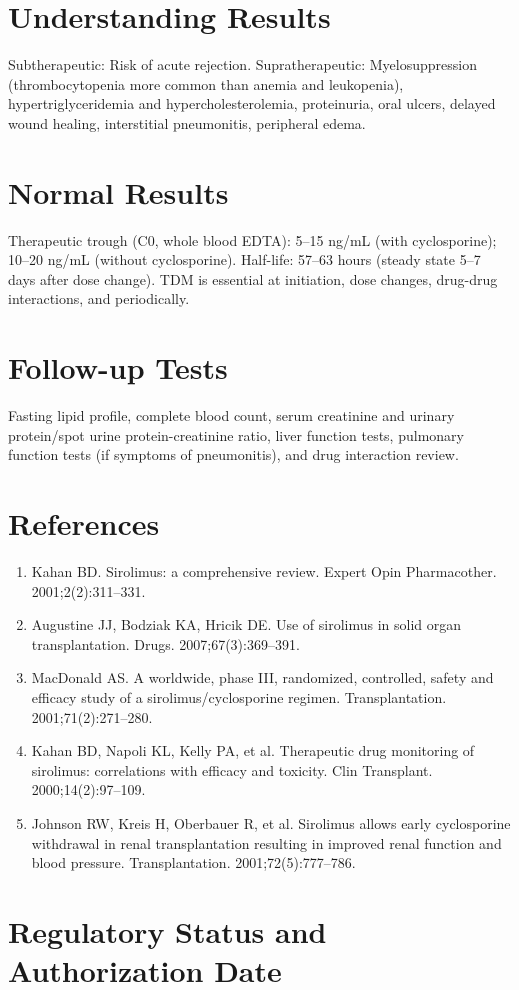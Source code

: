 \section*{Understanding Results}
Subtherapeutic: Risk of acute rejection. Supratherapeutic: Myelosuppression (thrombocytopenia more common than anemia and leukopenia), hypertriglyceridemia and hypercholesterolemia, proteinuria, oral ulcers, delayed wound healing, interstitial pneumonitis, peripheral edema.
\section*{Normal Results}
Therapeutic trough (C0, whole blood EDTA): 5--15 ng/mL (with cyclosporine); 10--20 ng/mL (without cyclosporine). Half-life: 57--63 hours (steady state 5--7 days after dose change). TDM is essential at initiation, dose changes, drug-drug interactions, and periodically.
\section*{Follow-up Tests}
Fasting lipid profile, complete blood count, serum creatinine and urinary protein/spot urine protein-creatinine ratio, liver function tests, pulmonary function tests (if symptoms of pneumonitis), and drug interaction review.
\section*{References}
\begin{enumerate}
  \item Kahan BD. Sirolimus: a comprehensive review. Expert Opin Pharmacother. 2001;2(2):311--331.
  \item Augustine JJ, Bodziak KA, Hricik DE. Use of sirolimus in solid organ transplantation. Drugs. 2007;67(3):369--391.
  \item MacDonald AS. A worldwide, phase III, randomized, controlled, safety and efficacy study of a sirolimus/cyclosporine regimen. Transplantation. 2001;71(2):271--280.
  \item Kahan BD, Napoli KL, Kelly PA, et al. Therapeutic drug monitoring of sirolimus: correlations with efficacy and toxicity. Clin Transplant. 2000;14(2):97--109.
  \item Johnson RW, Kreis H, Oberbauer R, et al. Sirolimus allows early cyclosporine withdrawal in renal transplantation resulting in improved renal function and blood pressure. Transplantation. 2001;72(5):777--786.
\end{enumerate}
\clearpage
\section*{Regulatory Status and Authorization Date}

\clearpage
